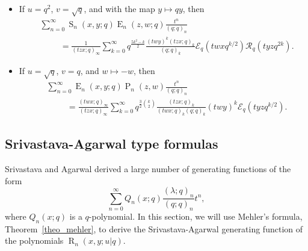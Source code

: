 \documentclass{cimart}
\newcommand{\EE}{\mathcal{E}}
\newcommand{\RR}{\mathcal{R}}
\DeclareMathOperator{\opE}{E}
\DeclareMathOperator{\opP}{P}
\DeclareMathOperator{\opR}{R}
\DeclareMathOperator{\opS}{S}
\begin{document}
\begin{itemize}
    \item 
    If $u=q^{2}$, $v=\sqrt{q}$, and with the map $y\mapsto qy$, then
    \begin{align}
        &\sum_{n=0}^{\infty}\opS_{n}(x,y;q)\opE_{n}(z,w;q)\frac{t^n}{(q;q)_{n}}\nonumber\\
        &\hspace{1cm}=\frac{1}{(tzx;q)_{\infty}}\sum_{k=0}^{\infty}q^{\frac{5k^2-k}{2}}\frac{(twy)^k(tzx;q)_{k}}{(q;q)_{k}}\EE_{q}(twxq^{k/2})\RR_{q}(tyzq^{2k}).
    \end{align}

    \item 
    If $u=\sqrt{q}$, $v=q$, and $w\mapsto-w$, then
    \begin{align}
        &\sum_{n=0}^{\infty}\opE_{n}(x,y;q)\opP_{n}(z,w)\frac{t^n}{(q;q)_{n}}\nonumber\\
        &\hspace{1cm}=\frac{(twx;q)_{\infty}}{(tzx;q)_{\infty}}\sum_{k=0}^{\infty}q^{\frac{3}{2}\binom{k}{2}}\frac{(tzx;q)_{k}}{(twx;q)_{k}(q;q)_{k}}(twy)^k\mathcal{E}_{q}(tyzq^{k/2}).
    \end{align}
    
\end{itemize}

\subsection{Srivastava-Agarwal type formulas}

Srivastava and Agarwal \cite{Sri} derived a large number of generating functions of the form
\begin{equation}\label{eqn_SA}
    \sum_{n=0}^{\infty}Q_{n}(x;q)\frac{(\lambda;q)_{n}}{(q;q)_{n}}t^n,
\end{equation}
where $Q_{n}(x;q)$ is a $q$-polynomial. In this section, we will use Mehler's formula, Theorem~\ref{theo_mehler}, to derive the Srivastava-Agarwal generating function of the polynomials $\opR_{n}(x,y;u|q)$. 
\end{document}
